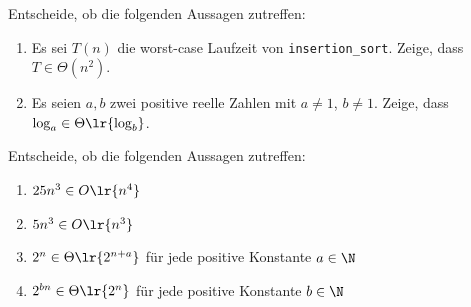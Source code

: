 \begin{frame}
	\begin{myexercise}\label{myexercise:complexity00}
		Entscheide, ob die folgenden Aussagen zutreffen:
		\begin{enumerate}
			\item Es sei $T(n)$ die worst-case Laufzeit von \texttt{insertion\_sort}. Zeige, dass $T\in\Theta(n^2)$.
			\item Es seien $a, b$ zwei positive reelle Zahlen mit $a\neq 1$, $b\neq 1$. Zeige, dass $\log_a\in\Theta\lr{\log_b}$.
		\end{enumerate}
	\end{myexercise}
\end{frame}
\begin{frame}
	\begin{myexercise}\label{myexercise:complexity01}
		Entscheide, ob die folgenden Aussagen zutreffen:
		\begin{enumerate}
			\item $25n^3 \in O\lr{n^4}$
			\item $5n^3 \in O\lr{n^3}$
			\item $2^n \in \Theta\lr{2^{n + a}}$ für jede positive Konstante $a\in\N$
			\item $2^{bn} \in \Theta\lr{2^n}$ für jede positive Konstante $b\in\N$
		\end{enumerate}
	\end{myexercise}
\end{frame}

